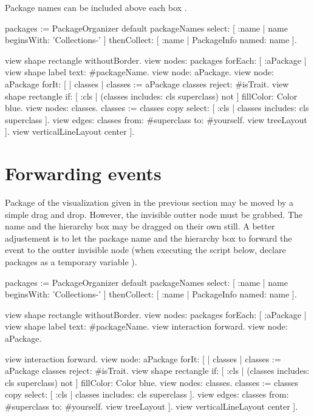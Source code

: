 \documentclass[a4paper,10pt,twoside]{book}
\begin{document}
Package names can be included above each box .

\begin{code}{}
packages := PackageOrganizer default packageNames
        select: [ :name | name beginsWith: 'Collections-' ] 
        thenCollect:  [ :name | PackageInfo named: name ].

view shape rectangle withoutBorder.
view nodes: packages forEach: [ :aPackage | 
  view shape label text: #packageName.
  view node: aPackage.
  view node: aPackage forIt: [
    | classes |
    classes := aPackage classes reject: #isTrait.
    view shape rectangle 
      if: [ :cls | (classes includes: cls superclass) not ] fillColor: Color blue.
    view nodes: classes.
    classes := classes copy select: [ :cls | classes includes: cls superclass ].
    view edges: classes from: #superclass to: #yourself.
    view treeLayout
  ].
  view verticalLineLayout center
].
\end{code}

\section{Forwarding events}

Package of the visualization given in the previous section may be moved by a simple drag and drop. However, the invisible outter node must be grabbed. The name and the hierarchy box may be dragged on their own still. A better adjustement is to let the package name and the hierarchy box to forward the event to the outter invisible node (when executing the script below, declare packages as a temporary variable ). 

\begin{code}{}
packages := PackageOrganizer default packageNames
        select: [ :name | name beginsWith: 'Collections-' ] 
        thenCollect:  [ :name | PackageInfo named: name ].

view shape rectangle withoutBorder.
view nodes: packages forEach: [ :aPackage | 
  view shape label text: #packageName.
  view interaction forward.
  view node: aPackage.

  view interaction forward.
  view node: aPackage forIt: [
    | classes |
    classes := aPackage classes reject: #isTrait.
    view shape rectangle 
      if: [ :cls | (classes includes: cls superclass) not ] fillColor: Color blue.
    view nodes: classes.
    classes := classes copy select: [ :cls | classes includes: cls superclass ].
    view edges: classes from: #superclass to: #yourself.
    view treeLayout
  ].
  view verticalLineLayout center
].
\end{code}
\end{document}
